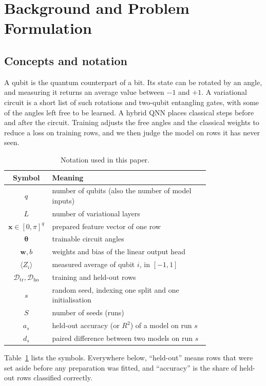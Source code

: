 \documentclass[12pt,onecolumn,draftclsnofoot]{IEEEtran}
\begin{document}
\section{Background and Problem Formulation}
\subsection{Concepts and notation}
A qubit is the quantum counterpart of a bit. Its state can be rotated by an angle, and measuring it returns an average value between $-1$ and $+1$. A variational circuit is a short list of such rotations and two-qubit entangling gates, with some of the angles left free to be learned. A hybrid QNN places classical steps before and after the circuit. Training adjusts the free angles and the classical weights to reduce a loss on training rows, and we then judge the model on rows it has never seen.

\begin{table}[!t]
\caption{Notation used in this paper.}
\label{tab:notation}
\centering\small
\begin{tabular}{cp{0.78\linewidth}}
\toprule
Symbol & Meaning\\
\midrule
$q$ & number of qubits (also the number of model inputs)\\
$L$ & number of variational layers\\
$\mathbf{x}\in[0,\pi]^q$ & prepared feature vector of one row\\
$\boldsymbol{\theta}$ & trainable circuit angles\\
$\mathbf{w},b$ & weights and bias of the linear output head\\
$\langle Z_i\rangle$ & measured average of qubit $i$, in $[-1,1]$\\
$\mathcal{D}_\mathrm{tr},\mathcal{D}_\mathrm{ho}$ & training and held-out rows\\
$s$ & random seed, indexing one split and one initialisation\\
$S$ & number of seeds (runs)\\
$a_s$ & held-out accuracy (or $R^2$) of a model on run $s$\\
$d_s$ & paired difference between two models on run $s$\\
\bottomrule
\end{tabular}
\end{table}

Table~\ref{tab:notation} lists the symbols. Everywhere below, ``held-out'' means rows that were set aside before any preparation was fitted, and ``accuracy'' is the share of held-out rows classified correctly.
\end{document}

